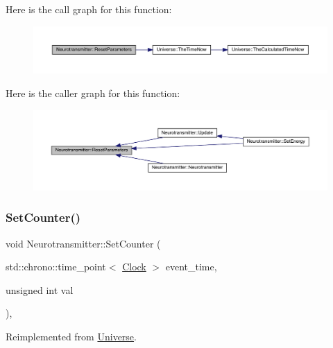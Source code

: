 Here is the call graph for this function\+:\nopagebreak
\begin{figure}[H]
\begin{center}
\leavevmode
\includegraphics[width=350pt]{class_neurotransmitter_a6e7650d738bccfbbd49ede10970687aa_cgraph}
\end{center}
\end{figure}
Here is the caller graph for this function\+:
\nopagebreak
\begin{figure}[H]
\begin{center}
\leavevmode
\includegraphics[width=350pt]{class_neurotransmitter_a6e7650d738bccfbbd49ede10970687aa_icgraph}
\end{center}
\end{figure}
\mbox{\label{class_neurotransmitter_ae16ec051609867d4f64fad5ba4449443}} 
\subsubsection{\texorpdfstring{Set\+Counter()}{SetCounter()}}
{\footnotesize\ttfamily void Neurotransmitter\+::\+Set\+Counter (\begin{DoxyParamCaption}\item[{std\+::chrono\+::time\+\_\+point$<$ \hyperlink{universe_8h_a0ef8d951d1ca5ab3cfaf7ab4c7a6fd80}{Clock} $>$}]{event\+\_\+time,  }\item[{unsigned int}]{val }\end{DoxyParamCaption})\hspace{0.3cm}{\ttfamily [inline]}, {\ttfamily [virtual]}}



Reimplemented from \hyperlink{class_universe_aa22202ae740eb1355529afcb13285e91}{Universe}.



